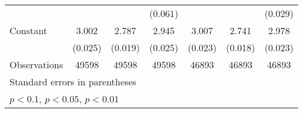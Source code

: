 {\begin{tabular}{l*{6}{c}}
                    &                     &                     &     (0.061)         &                     &                     &     (0.029)         \\
Constant            &       3.002\sym{***}&       2.787\sym{***}&       2.945\sym{***}&       3.007\sym{***}&       2.741\sym{***}&       2.978\sym{***}\\
                    &     (0.025)         &     (0.019)         &     (0.025)         &     (0.023)         &     (0.018)         &     (0.023)         \\
\hline
Observations        &       49598         &       49598         &       49598         &       46893         &       46893         &       46893         \\
\hline\hline
\multicolumn{7}{l}{\footnotesize Standard errors in parentheses}\\
\multicolumn{7}{l}{\footnotesize \sym{*} \(p<0.1\), \sym{**} \(p<0.05\), \sym{***} \(p<0.01\)}\\
\end{tabular}
}
